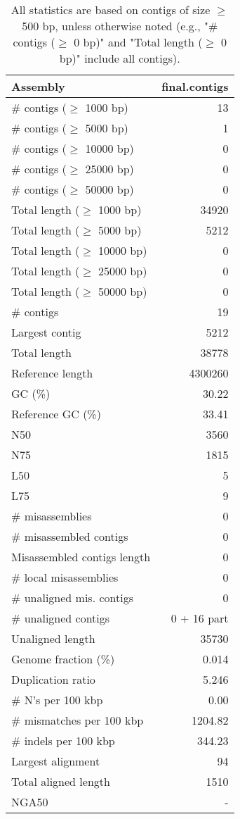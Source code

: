 \documentclass[12pt,a4paper]{article}
\begin{document}
\begin{table}[ht]
\begin{center}
\caption{All statistics are based on contigs of size $\geq$ 500 bp, unless otherwise noted (e.g., "\# contigs ($\geq$ 0 bp)" and "Total length ($\geq$ 0 bp)" include all contigs).}
\begin{tabular}{|l*{1}{|r}|}
\hline
Assembly & final.contigs \\ \hline
\# contigs ($\geq$ 1000 bp) & 13 \\ \hline
\# contigs ($\geq$ 5000 bp) & 1 \\ \hline
\# contigs ($\geq$ 10000 bp) & 0 \\ \hline
\# contigs ($\geq$ 25000 bp) & 0 \\ \hline
\# contigs ($\geq$ 50000 bp) & 0 \\ \hline
Total length ($\geq$ 1000 bp) & 34920 \\ \hline
Total length ($\geq$ 5000 bp) & 5212 \\ \hline
Total length ($\geq$ 10000 bp) & 0 \\ \hline
Total length ($\geq$ 25000 bp) & 0 \\ \hline
Total length ($\geq$ 50000 bp) & 0 \\ \hline
\# contigs & 19 \\ \hline
Largest contig & 5212 \\ \hline
Total length & 38778 \\ \hline
Reference length & 4300260 \\ \hline
GC (\%) & 30.22 \\ \hline
Reference GC (\%) & 33.41 \\ \hline
N50 & 3560 \\ \hline
N75 & 1815 \\ \hline
L50 & 5 \\ \hline
L75 & 9 \\ \hline
\# misassemblies & 0 \\ \hline
\# misassembled contigs & 0 \\ \hline
Misassembled contigs length & 0 \\ \hline
\# local misassemblies & 0 \\ \hline
\# unaligned mis. contigs & 0 \\ \hline
\# unaligned contigs & 0 + 16 part \\ \hline
Unaligned length & 35730 \\ \hline
Genome fraction (\%) & 0.014 \\ \hline
Duplication ratio & 5.246 \\ \hline
\# N's per 100 kbp & 0.00 \\ \hline
\# mismatches per 100 kbp & 1204.82 \\ \hline
\# indels per 100 kbp & 344.23 \\ \hline
Largest alignment & 94 \\ \hline
Total aligned length & 1510 \\ \hline
NGA50 & - \\ \hline
\end{tabular}
\end{center}
\end{table}
\end{document}
